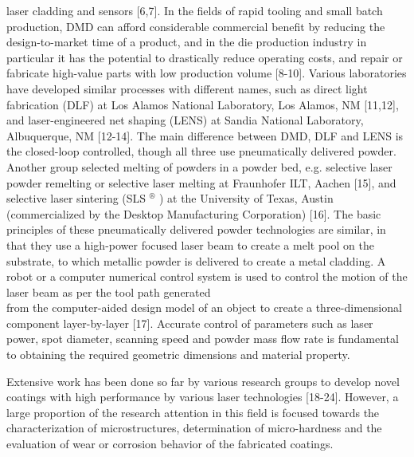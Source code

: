 \documentclass[10pt]{article}
\begin{document}
laser cladding and sensors [6,7]. In the fields of rapid tooling and small batch production, DMD can afford considerable commercial benefit by reducing the design-to-market time of a product, and in the die production industry in particular it has the potential to drastically reduce operating costs, and repair or fabricate high-value parts with low production volume [8-10]. Various laboratories have developed similar processes with different names, such as direct light fabrication (DLF) at Los Alamos National Laboratory, Los Alamos, NM [11,12], and laser-engineered net shaping (LENS) at Sandia National Laboratory, Albuquerque, NM [12-14]. The main difference between DMD, DLF and LENS is the closed-loop controlled, though all three use pneumatically delivered powder. Another group selected melting of powders in a powder bed, e.g. selective laser powder remelting or selective laser melting at Fraunhofer ILT, Aachen [15], and selective laser sintering (SLS ${ }^{\circledR}$ ) at the University of Texas, Austin (commercialized by the Desktop Manufacturing Corporation) [16]. The basic principles of these pneumatically delivered powder technologies are similar, in that they use a high-power focused laser beam to create a melt pool on the substrate, to which metallic powder is delivered to create a metal cladding. A robot or a computer numerical control system is used to control the motion of the laser beam as per the tool path generated\\
from the computer-aided design model of an object to create a three-dimensional component layer-by-layer [17]. Accurate control of parameters such as laser power, spot diameter, scanning speed and powder mass flow rate is fundamental to obtaining the required geometric dimensions and material property.

Extensive work has been done so far by various research groups to develop novel coatings with high performance by various laser technologies [18-24]. However, a large proportion of the research attention in this field is focused towards the characterization of microstructures, determination of micro-hardness and the evaluation of wear or corrosion behavior of the fabricated coatings.
\end{document}
